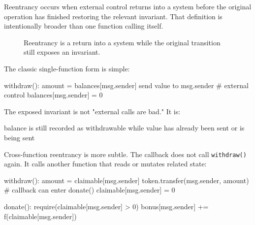 Reentrancy occurs when external control returns into a system before the original operation has finished restoring the relevant invariant. That definition is intentionally broader than one function calling itself.

\begin{figure}[htbp]
\centering
{}
\caption{Reentrancy is a return into a system while the original transition still exposes an invariant.}
\end{figure}

The classic single-function form is simple:

\begin{codeblock}
withdraw():
    amount = balances[msg.sender]
    send value to msg.sender        # external control
    balances[msg.sender] = 0
\end{codeblock}

The exposed invariant is not "external calls are bad." It is:

\begin{codeblock}
balance is still recorded as withdrawable
while value has already been sent or is being sent
\end{codeblock}

Cross-function reentrancy is more subtle. The callback does not call \texttt{withdraw()} again. It calls another function that reads or mutates related state:

\begin{codeblock}
withdraw():
    amount = claimable[msg.sender]
    token.transfer(msg.sender, amount)    # callback can enter donate()
    claimable[msg.sender] = 0

donate():
    require(claimable[msg.sender] > 0)
    bonus[msg.sender] += f(claimable[msg.sender])
\end{codeblock}

